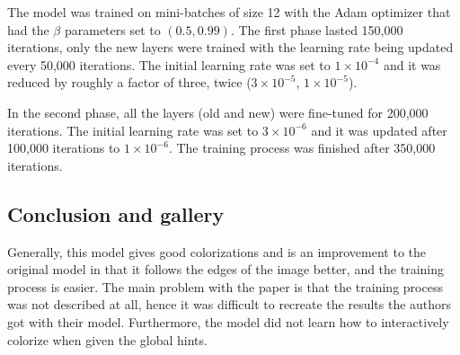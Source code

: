 The model was trained on mini-batches of size 12 with the Adam optimizer that had the 
$\beta$ parameters set to $(0.5, 0.99)$. The first phase lasted 150,000 
iterations, only the new layers were trained with the learning rate being updated 
every 50,000 iterations. The initial learning rate was set to $1\times10^{-4}$ and
it was reduced by roughly a factor of three, twice ($3\times10^{-5}$, $1\times10^{-5}$). 

In the second phase, all the layers (old and new) were fine-tuned for 200,000 iterations.
The initial learning rate was set to $3\times10^{-6}$ and it was updated after 100,000
iterations to $1\times10^{-6}$. The training process was finished after 350,000 iterations.

\subsection{Conclusion and gallery}

Generally, this model gives good colorizations and is an improvement 
to the original model in that it follows the edges of the image better, 
and the training process is easier. The main problem with the paper is that
the training process was not described at all, hence it was difficult to 
recreate the results the authors got with their model. Furthermore, the model 
did not learn how to interactively colorize when given the global hints. 


